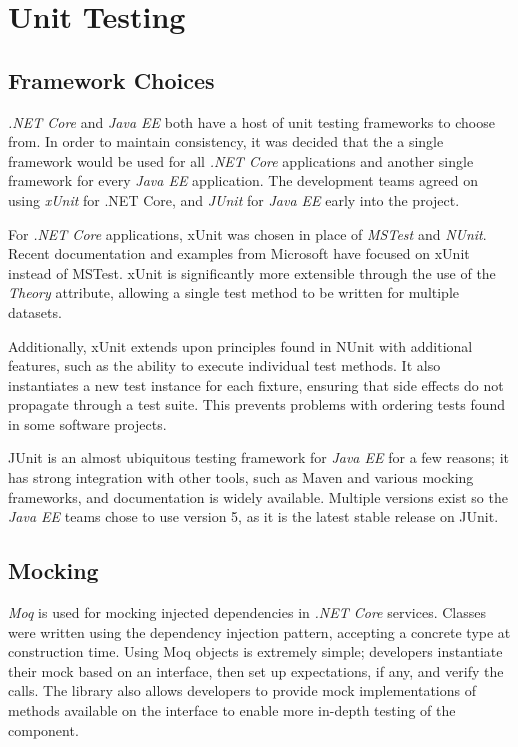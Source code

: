 \section{Unit Testing}
\par

\par
\subsection{Framework Choices}
\textit{.NET Core} and \textit{Java EE} both have a host of unit testing frameworks to choose from. In order to maintain consistency, it was decided that the a single framework would be used for all \textit{.NET Core} applications and another single framework for every \textit{Java EE} application. The development teams agreed on using \textit{xUnit}\cite{xUnit} for .NET Core, and \textit{JUnit}\cite{JUnit} for \textit{Java EE} early into the project.

\par
For \textit{.NET Core} applications, xUnit was chosen in place of \textit{MSTest} and \textit{NUnit}. Recent documentation and examples from Microsoft have focused on xUnit instead of MSTest. xUnit is significantly more extensible through the use of the \textit{Theory} attribute, allowing a single test method to be written for multiple datasets.

\par
Additionally, xUnit extends upon principles found in NUnit with additional features, such as the ability to execute individual test methods\cite{Nunit_XUnit_comparison}. It also instantiates a new test instance for each fixture, ensuring that side effects do not propagate through a test suite. This prevents problems with ordering tests found in some software projects.

\par
JUnit is an almost ubiquitous testing framework for \textit{Java EE} for a few reasons; it has strong integration with other tools, such as Maven and various mocking frameworks, and documentation is widely available. Multiple versions exist so the \textit{Java EE} teams chose to use version 5, as it is the latest stable release on JUnit.

\subsection{Mocking}
\par
\textit{Moq}\cite{Moq} is used for mocking injected dependencies in \textit{.NET Core} services. Classes were written using the dependency injection pattern, accepting a concrete type at construction time. Using Moq objects is extremely simple; developers instantiate their mock based on an interface, then set up expectations, if any, and verify the calls.  The library also allows developers to provide mock implementations of methods available on the interface to enable more in-depth testing of the component.

